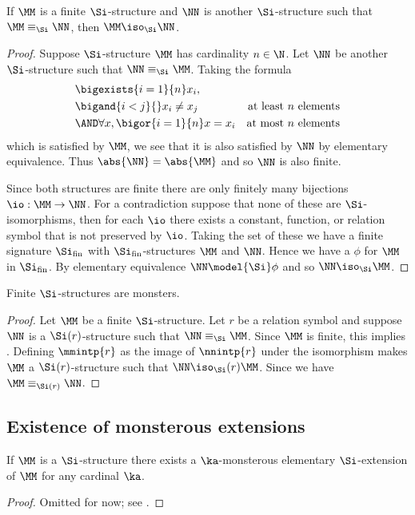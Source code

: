 \begin{cor}
    If $\MM$ is a finite $\Si$-structure and $\NN$ is another $\Si$-structure
    such that $\MM \equiv_\Si \NN$, then $\MM \iso_\Si \NN$.
\end{cor}
\begin{proof}
    Suppose $\Si$-structure $\MM$ has cardinality $n \in \N$.
    Let $\NN$ be another $\Si$-structure such that $\NN \equiv_\Si \MM$.
    Taking the formula 
    \begin{align*}
        &\bigexists{i = 1}{n} x_i,\\
        & \bigand{i < j}{} x_i \ne x_j &\text{at least $n$ elements}\\
        & \AND \forall x, \bigor{i = 1}{n} x = x_i 
        &\text{at most $n$ elements}
    \end{align*}
    which is satisfied by $\MM$, 
    we see that it is also satisfied by $\NN$ by elementary equivalence.
    Thus $\abs{\NN} = \abs{\MM}$ and so $\NN$ is also finite.

    Since both structures are finite there are only finitely many 
    bijections $\io : \MM \to \NN$.
    For a contradiction suppose that none of these are $\Si$-isomorphisms,
    then for each $\io$ there exists a constant, function, or relation symbol
    that is not preserved by $\io$.
    Taking the set of these we have a finite signature $\Si_{\text{fin}}$
    with $\Si_{\text{fin}}$-structures $\MM$ and $\NN$.
    Hence we have a 
    $\phi$ for $\MM$ in $\Si_{\text{fin}}$.
    By elementary equivalence $\NN \model{\Si} \phi$ and so 
    $\NN \iso_\Si \MM$.
\end{proof}

\begin{cor}
    Finite $\Si$-structures are monsters.
\end{cor}
\begin{proof}
    Let $\MM$ be a finite $\Si$-structure.
    Let $r$ be a relation symbol and suppose $\NN$ is a $\Si(r)$-structure 
    such that $\NN \equiv_{\Si} \MM$.
    Since $\MM$ is finite, 
    this implies .
    Defining $\mmintp{r}$ as the image of $\nnintp{r}$ under the isomorphism
    makes $\MM$ a $\Si(r)$-structure such that $\NN \iso_\Si(r) \MM$.
    Since 
    we have $\MM \equiv_{\Si(r)} \NN$.
\end{proof}

\subsection{Existence of monsterous extensions}
\begin{prop}
    If $\MM$ is a $\Si$-structure there exists a $\ka$-monsterous elementary 
    $\Si$-extension of $\MM$ for any cardinal $\ka$.
\end{prop}
\begin{proof}
    Omitted for now; see \cite{hodges}.
\end{proof}
